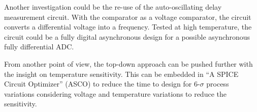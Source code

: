 Another investigation could be the re-use of the auto-oscillating delay measurement circuit. With the comparator as a voltage comparator, the circuit converts a differential voltage into a frequency. Tested at high temperature, the circuit could be a fully digital asynchronous design for a possible asynchronous fully differential ADC\@.

From another point of view, the top-down approach can be pushed further with the insight on temperature sensitivity. This can be embedded in ``A SPICE Circuit Optimizer'' (ASCO) to reduce the time to design for 6-$\sigma$ process variations considering voltage and temperature variations to reduce the sensitivity.
